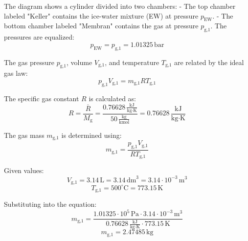 The diagram shows a cylinder divided into two chambers:  
- The top chamber labeled "Keller" contains the ice-water mixture (EW) at pressure \( p_{\text{EW}} \).  
- The bottom chamber labeled "Membran" contains the gas at pressure \( p_{\text{g,1}} \).  
The pressures are equalized:  
\[
p_{\text{EW}} = p_{\text{g,1}} = 1.01325 \, \text{bar}
\]

The gas pressure \( p_{\text{g,1}} \), volume \( V_{\text{g,1}} \), and temperature \( T_{\text{g,1}} \) are related by the ideal gas law:  
\[
p_{\text{g,1}} V_{\text{g,1}} = m_{\text{g,1}} R T_{\text{g,1}}
\]

The specific gas constant \( R \) is calculated as:  
\[
R = \frac{\bar{R}}{M_{\text{g}}} = \frac{0.76628 \, \frac{\text{kJ}}{\text{kg·K}}}{50 \, \frac{\text{kg}}{\text{kmol}}} = 0.76628 \, \frac{\text{kJ}}{\text{kg·K}}
\]

The gas mass \( m_{\text{g,1}} \) is determined using:  
\[
m_{\text{g,1}} = \frac{p_{\text{g,1}} V_{\text{g,1}}}{R T_{\text{g,1}}}
\]

Given values:  
\[
V_{\text{g,1}} = 3.14 \, \text{L} = 3.14 \, \text{dm}^3 = 3.14 \cdot 10^{-3} \, \text{m}^3
\]  
\[
T_{\text{g,1}} = 500^\circ\text{C} = 773.15 \, \text{K}
\]

Substituting into the equation:  
\[
m_{\text{g,1}} = \frac{1.01325 \cdot 10^5 \, \text{Pa} \cdot 3.14 \cdot 10^{-3} \, \text{m}^3}{0.76628 \, \frac{\text{kJ}}{\text{kg·K}} \cdot 773.15 \, \text{K}}
\]  
\[
m_{\text{g,1}} = 2.47485 \, \text{kg}
\]